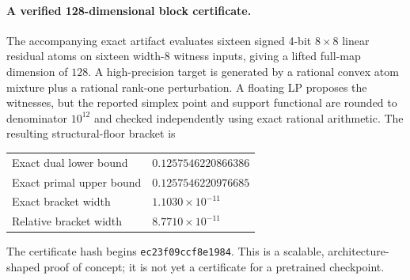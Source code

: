 \documentclass[twoside,11pt]{article}
\begin{document}
\paragraph{A verified 128-dimensional block certificate.}
The accompanying exact artifact evaluates sixteen signed 4-bit $8\times8$
linear residual atoms on sixteen width-8 witness inputs, giving a lifted
full-map dimension of $128$.  A high-precision target is generated by a
rational convex atom mixture plus a rational rank-one perturbation.  A floating
LP proposes the witnesses, but the reported simplex point and support
functional are rounded to denominator $10^{12}$ and checked independently
using exact rational arithmetic.  The resulting structural-floor bracket is
\begin{center}
\begin{tabular}{@{}ll@{}}
\toprule
Exact dual lower bound & $0.1257546220866386$\\
Exact primal upper bound & $0.1257546220976685$\\
Exact bracket width & $1.1030\times10^{-11}$\\
Relative bracket width & $8.7710\times10^{-11}$\\
\bottomrule
\end{tabular}
\end{center}
The certificate hash begins \texttt{ec23f09ccf8e1984}.  This is a scalable,
architecture-shaped proof of concept; it is not yet a certificate for a
pretrained checkpoint.

\end{document}
